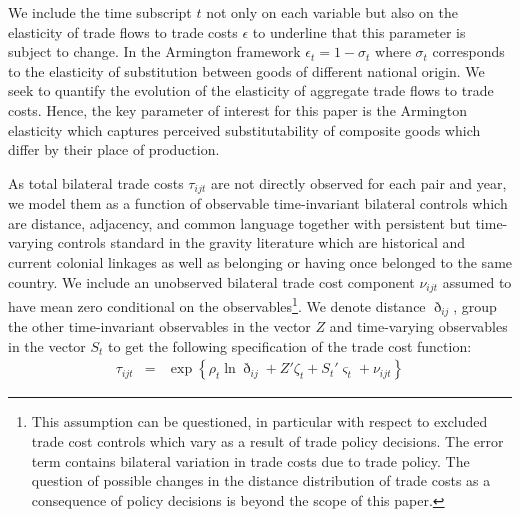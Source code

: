 \documentclass[12pt,twoside,a4paper,notitlepage]{article}
\begin{document}
We include the time subscript $t$ not only on each variable but also on the elasticity of trade flows to trade costs $\epsilon$ to underline that this parameter is subject to change. In the Armington framework $\epsilon_t=1-\sigma_t$ where $\sigma_t$ corresponds to the elasticity of substitution between goods of different national origin. We seek to quantify the evolution of the elasticity of aggregate trade flows to trade costs. Hence, the key parameter of interest for this paper is the Armington elasticity which captures perceived substitutability of composite goods which differ by their place of production. 

As total bilateral trade costs $\tau_{ijt}$ are not directly observed for each pair and year, we model them as a function of observable time-invariant bilateral controls which are distance, adjacency, and common language together with persistent but time-varying controls standard in the gravity literature which are historical and current colonial linkages as well as belonging or having once belonged to the same country. We include an unobserved bilateral trade cost component $\nu_{ijt}$ assumed to have mean zero conditional on the observables\footnote{ This assumption can be questioned, in particular with respect to excluded trade cost controls which vary as a result of trade policy decisions. \fi The error term contains bilateral variation in trade costs due to trade policy. The question of possible changes in the distance distribution of trade costs as a consequence of policy decisions is beyond the scope of this paper.}. 
We denote distance $\eth_{ij}$, group the other time-invariant observables in the vector $Z$ and time-varying observables in the vector $S_t$ to get the following specification of the trade cost function:
\begin{eqnarray}
\tau_{ijt}&=&\exp\left\{\rho_t\ln{\eth_{ij}}+{Z}'\zeta_{t}+{S_t}'\varsigma_{t}+\nu_{ijt}\right\} \label{eqn:20}
\end{eqnarray}
\end{document}
